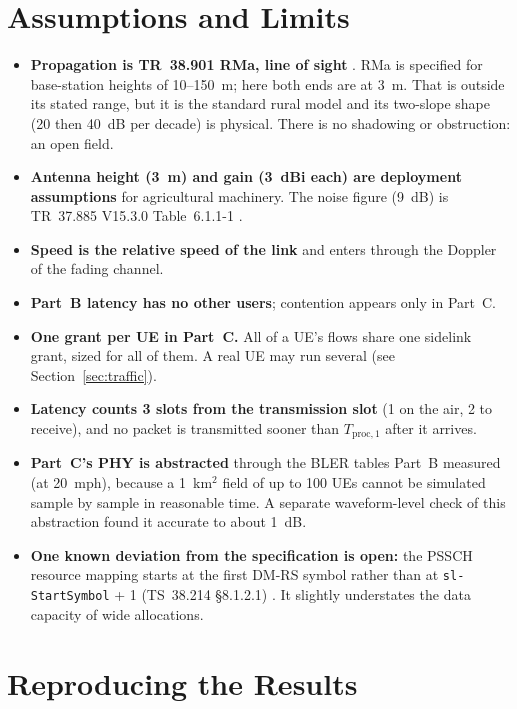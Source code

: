 \documentclass{article}
\newcommand{\code}[1]{\texttt{#1}}
\newcommand{\Tproc}{T_{\mathrm{proc},1}}
\begin{document}
\newpage
\section{Assumptions and Limits}
\label{sec:limits}

\begin{itemize}
  \item \textbf{Propagation is TR~38.901 RMa, line of sight}
  \cite{ref:38901}. RMa is specified for base-station heights of
  10--150~m; here both ends are at 3~m. That is outside its stated range,
  but it is the standard rural model and its two-slope shape (20 then
  40~dB per decade) is physical. There is no shadowing or obstruction:
  an open field.
  \item \textbf{Antenna height (3~m) and gain (3~dBi each) are deployment
  assumptions} for agricultural machinery. The noise figure (9~dB) is
  TR~37.885 V15.3.0 Table~6.1.1-1 \cite{ref:37885}.
  \item \textbf{Speed is the relative speed of the link} and enters
  through the Doppler of the fading channel.
  \item \textbf{Part~B latency has no other users}; contention appears
  only in Part~C.
  \item \textbf{One grant per UE in Part~C.} All of a UE's flows share one
  sidelink grant, sized for all of them. A real UE may run several (see
  Section~\ref{sec:traffic}).
  \item \textbf{Latency counts 3 slots from the transmission slot} (1 on
  the air, 2 to receive), and no packet is transmitted sooner than
  $\Tproc$ after it arrives.
  \item \textbf{Part~C's PHY is abstracted} through the BLER tables Part~B
  measured (at 20~mph), because a 1~km$^2$ field of up to 100 UEs cannot
  be simulated sample by sample in reasonable time. A separate
  waveform-level check of this abstraction found it accurate to about
  1~dB.
  \item \textbf{One known deviation from the specification is open:} the
  PSSCH resource mapping starts at the first DM-RS symbol rather than at
  \code{sl-StartSymbol} + 1 (TS~38.214 \S8.1.2.1) \cite{ref:38214}. It
  slightly understates the data capacity of wide allocations.
\end{itemize}

\section{Reproducing the Results}
\label{sec:repro}
\end{document}
